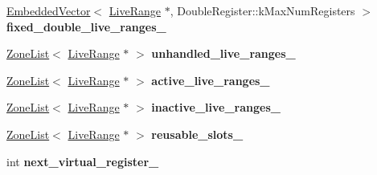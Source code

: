 \begin{DoxyCompactItemize}
\item 
\hyperlink{classv8_1_1internal_1_1_embedded_vector}{Embedded\+Vector}$<$ \hyperlink{classv8_1_1internal_1_1_live_range}{Live\+Range} $\ast$, Double\+Register\+::k\+Max\+Num\+Registers $>$ {\bfseries fixed\+\_\+double\+\_\+live\+\_\+ranges\+\_\+}\hypertarget{classv8_1_1internal_1_1_b_a_s_e___e_m_b_e_d_d_e_d_a1d4f33c97540395650933253f1273fea}{}\label{classv8_1_1internal_1_1_b_a_s_e___e_m_b_e_d_d_e_d_a1d4f33c97540395650933253f1273fea}

\item 
\hyperlink{classv8_1_1internal_1_1_zone_list}{Zone\+List}$<$ \hyperlink{classv8_1_1internal_1_1_live_range}{Live\+Range} $\ast$ $>$ {\bfseries unhandled\+\_\+live\+\_\+ranges\+\_\+}\hypertarget{classv8_1_1internal_1_1_b_a_s_e___e_m_b_e_d_d_e_d_a353ccb395a27f08d60d3d318df50274b}{}\label{classv8_1_1internal_1_1_b_a_s_e___e_m_b_e_d_d_e_d_a353ccb395a27f08d60d3d318df50274b}

\item 
\hyperlink{classv8_1_1internal_1_1_zone_list}{Zone\+List}$<$ \hyperlink{classv8_1_1internal_1_1_live_range}{Live\+Range} $\ast$ $>$ {\bfseries active\+\_\+live\+\_\+ranges\+\_\+}\hypertarget{classv8_1_1internal_1_1_b_a_s_e___e_m_b_e_d_d_e_d_a6f89f78188b13c4215d8f940f9aace16}{}\label{classv8_1_1internal_1_1_b_a_s_e___e_m_b_e_d_d_e_d_a6f89f78188b13c4215d8f940f9aace16}

\item 
\hyperlink{classv8_1_1internal_1_1_zone_list}{Zone\+List}$<$ \hyperlink{classv8_1_1internal_1_1_live_range}{Live\+Range} $\ast$ $>$ {\bfseries inactive\+\_\+live\+\_\+ranges\+\_\+}\hypertarget{classv8_1_1internal_1_1_b_a_s_e___e_m_b_e_d_d_e_d_a1b25128252b71691c1ee5cd7b05bdf9e}{}\label{classv8_1_1internal_1_1_b_a_s_e___e_m_b_e_d_d_e_d_a1b25128252b71691c1ee5cd7b05bdf9e}

\item 
\hyperlink{classv8_1_1internal_1_1_zone_list}{Zone\+List}$<$ \hyperlink{classv8_1_1internal_1_1_live_range}{Live\+Range} $\ast$ $>$ {\bfseries reusable\+\_\+slots\+\_\+}\hypertarget{classv8_1_1internal_1_1_b_a_s_e___e_m_b_e_d_d_e_d_a6a91edbf5e90e76dc02448c99d347a46}{}\label{classv8_1_1internal_1_1_b_a_s_e___e_m_b_e_d_d_e_d_a6a91edbf5e90e76dc02448c99d347a46}

\item 
int {\bfseries next\+\_\+virtual\+\_\+register\+\_\+}\hypertarget{classv8_1_1internal_1_1_b_a_s_e___e_m_b_e_d_d_e_d_a56ee0ef7d369ff792eac89a0064a05f1}{}\label{classv8_1_1internal_1_1_b_a_s_e___e_m_b_e_d_d_e_d_a56ee0ef7d369ff792eac89a0064a05f1}


\end{DoxyCompactItemize}
